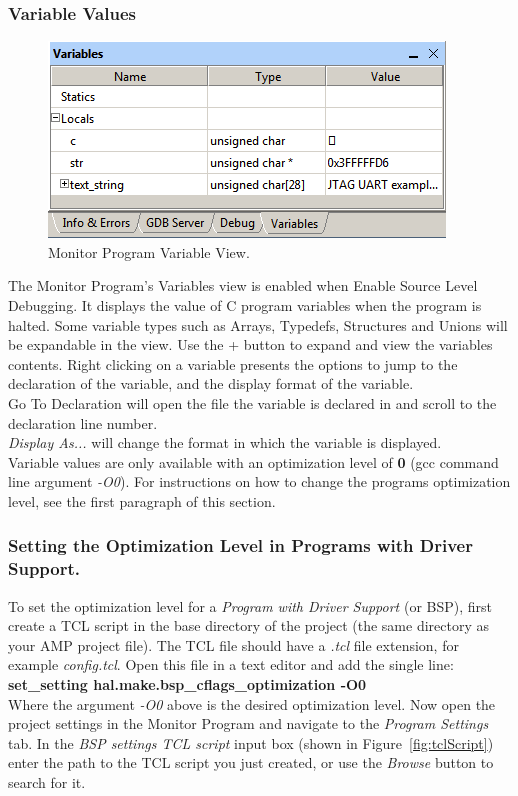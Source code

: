 \documentclass[11pt, twoside, pdftex]{article}
\begin{document}
\subsubsection{Variable Values}

\begin{figure}[H]
   \begin{center}
      \includegraphics[scale=0.7]{screenshots/figure29.png}
   \end{center}
   \caption{Monitor Program Variable View.}
	 \label{fig:29}
\end{figure}

The Monitor Program's {\sf Variables} view is enabled when {\sf Enable Source Level Debugging}. It displays the value of C program variables when the program is halted.
Some variable types such as Arrays,  Typedefs, Structures and Unions will be expandable in the view. Use the {\sf +} button to 
expand and view the variables contents. Right clicking on a variable presents the options to jump to the declaration of the variable,
and the display format of the variable.\\

{\sf Go To Declaration} will open the file the variable is declared in and scroll to the declaration line number.\\
{\it Display As...} will change the format in which the variable is displayed.\\

Variable values are only available with an optimization level of \textbf{0} (gcc command line argument {\it -O0}). For instructions on how to change
the programs optimization level, see the first paragraph of this section.


\subsubsection{Setting the Optimization Level in Programs with Driver Support.}
To set the optimization level for a {\it Program with Driver Support} (or BSP), first create a TCL script in the base directory of the project (the same directory as your AMP project file). The TCL file should have a {\it .tcl} file extension, for example {\it config.tcl}. Open this file in a text editor and add the single line:\\
{\bf set\_setting hal.make.bsp\_cflags\_optimization -O0}\\
Where the argument {\it -O0} above is the desired optimization level. Now open the project settings in the Monitor Program and navigate to the {\it Program Settings} tab. In the {\it BSP settings TCL script} input box (shown in Figure~\ref{fig:tclScript}) enter the path to the TCL script you just created, or use the {\it Browse} button to search for it.
\end{document}
